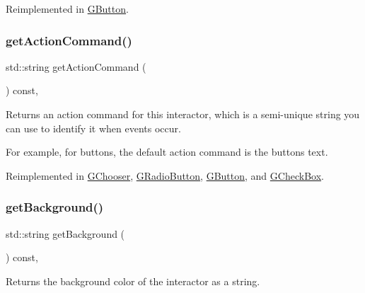 Reimplemented in \mbox{\hyperlink{classGButton_a57806dc9defb73f76f493f8548319924}{G\+Button}}.

\mbox{\label{classGInteractor_a94eb4276000c4fdfb508ce9e6317a82a}} 
\subsubsection{\texorpdfstring{get\+Action\+Command()}{getActionCommand()}}
{\footnotesize\ttfamily std\+::string get\+Action\+Command (\begin{DoxyParamCaption}{ }\end{DoxyParamCaption}) const\hspace{0.3cm}{\ttfamily [virtual]}, {\ttfamily [inherited]}}



Returns an action command for this interactor, which is a semi-\/unique string you can use to identify it when events occur. 

For example, for buttons, the default action command is the button\textquotesingle{}s text. 

Reimplemented in \mbox{\hyperlink{classGChooser_a4f83505141da1f8446f0e0e0a9507930}{G\+Chooser}}, \mbox{\hyperlink{classGRadioButton_a4f83505141da1f8446f0e0e0a9507930}{G\+Radio\+Button}}, \mbox{\hyperlink{classGButton_a4f83505141da1f8446f0e0e0a9507930}{G\+Button}}, and \mbox{\hyperlink{classGCheckBox_a4f83505141da1f8446f0e0e0a9507930}{G\+Check\+Box}}.

\mbox{\label{classGInteractor_a808e22cc1fdfbecf71ed8c64ef4600e0}} 
\subsubsection{\texorpdfstring{get\+Background()}{getBackground()}}
{\footnotesize\ttfamily std\+::string get\+Background (\begin{DoxyParamCaption}{ }\end{DoxyParamCaption}) const\hspace{0.3cm}{\ttfamily [virtual]}, {\ttfamily [inherited]}}



Returns the background color of the interactor as a string. 

